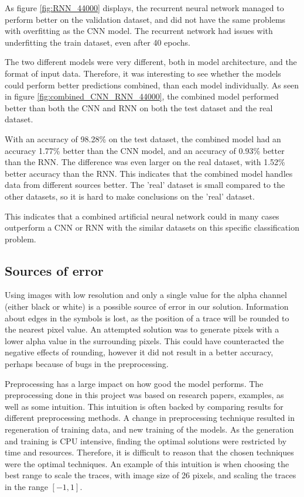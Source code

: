As figure \ref{fig:RNN_44000} displays, the recurrent neural network managed to perform better on the validation dataset, and did not have the same problems with overfitting as the CNN model. The recurrent network had issues with underfitting the train dataset, even after 40 epochs. 

The two different models were very different, both in model architecture, and the format of input data. Therefore, it was interesting to see whether the models could perform better predictions combined, than each model individually. As seen in figure \ref{fig:combined_CNN_RNN_44000}, the combined model performed better than both the CNN and RNN on both the test dataset and the real dataset. 

With an accuracy of 98.28\% on the test dataset, the combined model had an accuracy 1.77\% better than the CNN model, and an accuracy of 0.93\% better than the RNN. The difference was even larger on the real dataset, with 1.52\% better accuracy than the RNN. This indicates that the combined model handles data from different sources better. The 'real' dataset is small compared to the other datasets, so it is hard to make conclusions on the 'real' dataset. 

This indicates that a combined artificial neural network could in many cases outperform a CNN or RNN with the similar datasets on this specific classification problem. 

\subsection{Sources of error}

Using images with low resolution and only a single value for the alpha channel (either black or white) is a possible source of error in our solution. Information about edges in the symbols is lost, as the position of a trace will be rounded to the nearest pixel value. An attempted solution was to generate pixels with a lower alpha value in the surrounding pixels. This could have counteracted the negative effects of rounding, however it did not result in a better accuracy, perhaps because of bugs in the preprocessing.

Preprocessing has a large impact on how good the model performs. The preprocessing done in this project was based on research papers, examples, as well as some intuition. This intuition is often backed by comparing results for different preprocessing methods. A change in preprocessing technique resulted in regeneration of training data, and new training of the models. As the generation and training is CPU intensive, finding the optimal solutions were restricted by time and resources. Therefore, it is difficult to reason that the chosen techniques were the optimal techniques. An example of this intuition is when choosing the best range to scale the traces, with image size of 26 pixels, and scaling the traces in the range $[-1, 1]$. 

